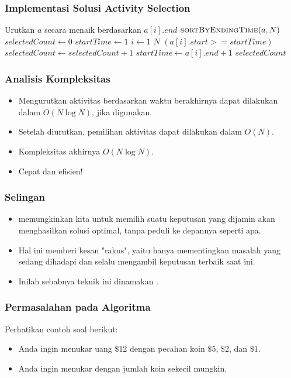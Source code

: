\begin{frame} [fragile]
  \frametitle{Implementasi Solusi Activity Selection}
  \begin{codebox}
    \li \Comment Urutkan $a$ secara menaik berdasarkan $a[i].end$
    \li $\textnormal{\scshape sortByEndingTime}(a, N)$
    \zi
    \li $selectedCount \gets 0$
    \li $startTime \gets 1$
    \li \For $i \gets 1$ \To $N$ \Do
    \li   \If $(a[i].start >= startTime)$ \Then
    \li     $selectedCount \gets selectedCount + 1$
    \li     $startTime \gets a[i].end + 1$
          \End
        \End
    \li \Return $selectedCount$
  \end{codebox}
\end{frame}

\begin{frame}
  \frametitle{Analisis Kompleksitas}
  \begin{itemize}
    \item Mengurutkan aktivitas berdasarkan waktu berakhirnya dapat dilakukan dalam $O(N \log{N})$, jika \fQuickSort digunakan.
    \item Setelah diurutkan, pemilihan aktivitas dapat dilakukan dalam $O(N)$.
    \item Kompleksitas akhirnya $O(N \log{N})$.
    \item Cepat dan efisien!
  \end{itemize}
\end{frame}

\begin{frame}
  \frametitle{Selingan}
  \begin{itemize}
    \item \fGreedyChoice memungkinkan kita untuk memilih suatu keputusan yang dijamin akan menghasilkan solusi optimal, tanpa peduli ke depannya seperti apa.
    \item Hal ini memberi kesan "rakus", yaitu hanya mementingkan masalah yang sedang dihadapi dan selalu mengambil keputusan terbaik saat ini.
    \item Inilah sebabnya teknik ini dinamakan \fGreedy.
  \end{itemize}
\end{frame}

\begin{frame}
  \frametitle{Permasalahan pada Algoritma \fGreedy}
  Perhatikan contoh soal berikut:
  \begin{itemize}
    \item Anda ingin menukar uang $\$12$ dengan pecahan koin $\$5$, $\$2$, dan $\$1$.
    \item Anda ingin menukar dengan jumlah koin sekecil mungkin.
  \end{itemize}
\end{frame}

